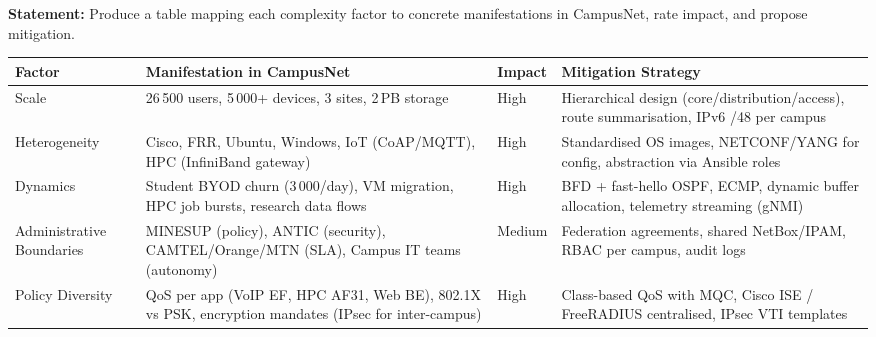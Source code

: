 \documentclass[11pt]{article}
\newcounter{popsec}
\newcounter{popsub}
\newcommand{\courssub}[1]{%
  \stepcounter{popsub}%
  \par\vspace{9pt}\noindent{\popxbold\fontsize{11.5}{13}\selectfont\color{popink}{\color{poporange}\thepopsec.\thepopsub}\hspace{6pt}#1}\par\nopagebreak\vspace{4pt}
}
\begin{document}
\courssub{Model answer}
\begin{exoresolu}
\textbf{Statement:} Produce a table mapping each complexity factor to concrete manifestations in CampusNet, rate impact, and propose mitigation.

\tcblower
\begin{center}
\begin{tabularx}{\linewidth}{|l|X|l|X|}
\hline
\rowcolor{popblueL}
\textbf{Factor} & \textbf{Manifestation in CampusNet} & \textbf{Impact} & \textbf{Mitigation Strategy} \\
\hline
Scale & 26\,500 users, 5\,000+ devices, 3 sites, 2\,PB storage & High & Hierarchical design (core/distribution/access), route summarisation, IPv6 /48 per campus \\
\hline
Heterogeneity & Cisco, FRR, Ubuntu, Windows, IoT (CoAP/MQTT), HPC (InfiniBand gateway) & High & Standardised OS images, NETCONF/YANG for config, abstraction via Ansible roles \\
\hline
Dynamics & Student BYOD churn (3\,000/day), VM migration, HPC job bursts, research data flows & High & BFD + fast-hello OSPF, ECMP, dynamic buffer allocation, telemetry streaming (gNMI) \\
\hline
Administrative Boundaries & MINESUP (policy), ANTIC (security), CAMTEL/Orange/MTN (SLA), Campus IT teams (autonomy) & Medium & Federation agreements, shared NetBox/IPAM, RBAC per campus, audit logs \\
\hline
Policy Diversity & QoS per app (VoIP EF, HPC AF31, Web BE), 802.1X vs PSK, encryption mandates (IPsec for inter-campus) & High & Class-based QoS with MQC, Cisco ISE / FreeRADIUS centralised, IPsec VTI templates \\
\hline
\end{tabularx}
\end{center}
\end{exoresolu}
\end{document}
